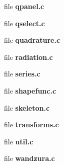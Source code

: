 \begin{DoxyCompactItemize}
file {\bfseries qpanel.\+c}
\item 
file {\bfseries qselect.\+c}
\item 
file {\bfseries quadrature.\+c}
\item 
file {\bfseries radiation.\+c}
\item 
file {\bfseries series.\+c}
\item 
file {\bfseries shapefunc.\+c}
\item 
file {\bfseries skeleton.\+c}
\item 
file {\bfseries transforms.\+c}
\item 
file {\bfseries util.\+c}
\item 
file {\bfseries wandzura.\+c}
\end{DoxyCompactItemize}

